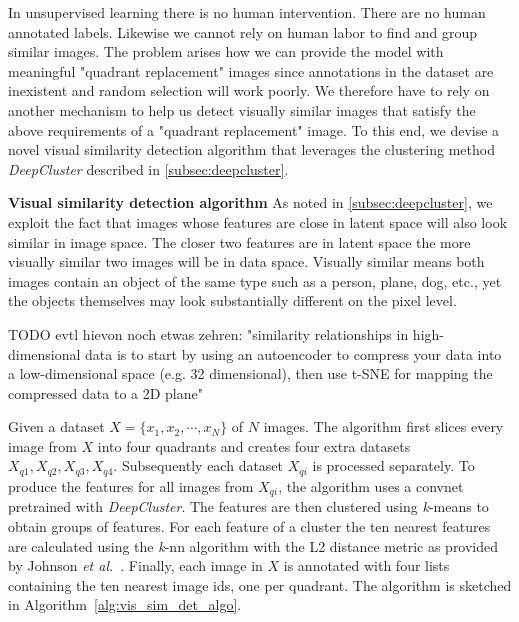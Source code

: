 \documentclass[12pt,a4paper]{article}
\begin{document}
In unsupervised learning there is no human intervention. There are no human annotated labels. Likewise we cannot rely on human labor to find and group similar images. The problem arises how we can provide the model with meaningful "quadrant replacement" images since annotations in the dataset are inexistent and random selection will work poorly. We therefore have to rely on another mechanism to help us detect visually similar images that satisfy the above requirements of a "quadrant replacement" image. To this end, we devise a novel visual similarity detection algorithm that leverages the clustering method \textit{DeepCluster} described in \ref{subsec:deepcluster}.

\textbf{Visual similarity detection algorithm} As noted in \ref{subsec:deepcluster}, we exploit the fact that images whose features are close in latent space will also look similar in image space. The closer two features are in latent space the more visually similar two images will be in data space. Visually similar means both images contain an object of the same type such as a person, plane, dog, etc., yet the objects themselves may look substantially different on the pixel level.

TODO evtl hievon noch etwas zehren: "similarity relationships in high-dimensional data is to start by using an autoencoder to compress your data into a low-dimensional space (e.g. 32 dimensional), then use t-SNE for mapping the compressed data to a 2D plane"

Given a dataset $X = \{x_1,x_2,\cdots,x_N\}$ of $N$ images. The algorithm first slices every image from $X$ into four quadrants and creates four extra datasets $X_{q1}, X_{q2}, X_{q3}, X_{q4}$. Subsequently each dataset $X_{qi}$ is processed separately. To produce the features for all images from $X_{qi}$, the algorithm uses a convnet pretrained with \textit{DeepCluster}. The features are then clustered using \textit{k}-means to obtain groups of features. For each feature of a cluster the ten nearest features are calculated using the \textit{k}-nn algorithm with the L2 distance metric as provided by Johnson \textit{et al.}~\cite{FaissKnn}. Finally, each image in $X$ is annotated with four lists containing the ten nearest image ids, one per quadrant. The algorithm is sketched in Algorithm~\ref{alg:vis_sim_det_algo}.
\end{document}
